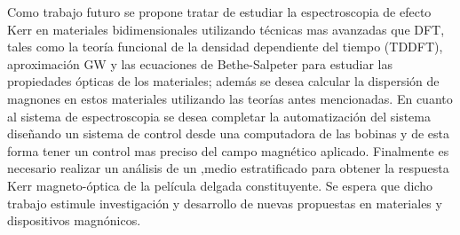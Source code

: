  \par Como trabajo futuro se propone tratar de estudiar la espectroscopia de efecto Kerr en materiales bidimensionales utilizando t\'ecnicas mas avanzadas que DFT, tales como la teor\'ia funcional de la densidad dependiente del tiempo (TDDFT)\cite{PhysRevLett.52.997}, aproximaci\'on GW\cite{Aryasetiawan_1998,PhysRevB.64.235106} y las ecuaciones de Bethe-Salpeter\cite{PhysRev.84.1232} para estudiar las propiedades \'opticas de los materiales; adem\'as se desea calcular la dispersión de magnones en estos materiales utilizando las teor\'ias antes mencionadas. En cuanto al sistema de espectroscopia se desea completar la automatizaci\'on del sistema dise\~nando un sistema de control desde una computadora de las bobinas y de esta forma tener un control mas preciso del campo magn\'etico aplicado. Finalmente es necesario realizar un an\'alisis de un ,medio estratificado para obtener la respuesta Kerr magneto-\'optica  de la película delgada constituyente. Se espera que dicho trabajo estimule investigaci\'on y desarrollo de nuevas propuestas en materiales y dispositivos magn\'onicos. 